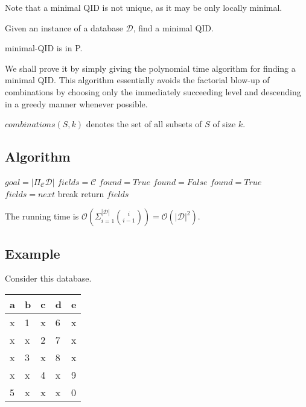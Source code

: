 \documentclass[12pt]{llncs}
\newcommand{\cD}{\mathcal{D}}
\newcommand{\Proj}[1]{\Pi_{#1}}
\begin{document}
Note that a minimal QID is not unique, as it may be only locally minimal.

\begin{problem}
Given an instance of a database $\cD$, find a minimal QID.
\end{problem}

\begin{proposition}
minimal-QID is in P.
\end{proposition}

We shall prove it by simply giving the polynomial time algorithm for finding a minimal QID. This algorithm essentially avoids the factorial blow-up of combinations by choosing only the immediately succeeding level and descending in a greedy manner whenever possible.

$combinations(S,k)$ denotes the set of all subsets of $S$ of size $k$.

\subsection{Algorithm}
\begin{algorithm}[H]
    \DontPrintSemicolon
    \KwData{A database $\cD$.}
    $goal = |\Proj{\mathcal{C}} \mathcal{D}|$\;
    $fields = \mathcal{C}$\;
    $found = True$\;
    {
        $found = False$\;
        {
            \If{$|\Proj{next} \mathcal{D}| = goal$}
            {
                $found = True$\;
                $fields = next$\;
                break\;
            }
        }
    }
    return $fields$\;
\end{algorithm}

The running time is $\mathcal{O}(\Sigma_{i=1}^{|\mathcal{D}|} \binom{i}{i-1}) = \mathcal{O}(|\mathcal{D}|^2)$.

\subsection{Example}
Consider this database.
\begin{center}
    \begin{tabular}{ | M{3em} | M{3em} | M{3em} | M{3em} | M{3em} | }
    \hline
    a & b & c & d & e\\
    \hline
    x & 1 & x & 6 & x\\
    x & x & 2 & 7 & x\\
    x & 3 & x & 8 & x\\
    x & x & 4 & x & 9\\
    5 & x & x & x & 0\\
    \hline
    \end{tabular}
\end{center}
\end{document}
